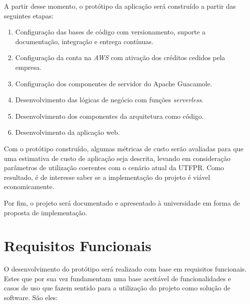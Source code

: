 A partir desse momento, o protótipo da aplicação será construído a partir das seguintes etapas:

\begin{enumerate}
    \item Configuração das bases de código com versionamento, suporte a documentação, integração e entrega contínuas.
    \item Configuração da conta na \textit{AWS} com ativação dos créditos cedidos pela empresa.
    \item Configuração dos componentes de servidor do Apache Guacamole.
    \item Desenvolvimento das lógicas de negócio com funções \textit{serverless}.
    \item Desenvolvimento dos componentes da arquitetura como código.
    \item Desenvolvimento da aplicação web.
\end{enumerate}

Com o protótipo construído, algumas métricas de custo serão avaliadas para que uma estimativa de custo de aplicação seja descrita, levando em consideração parâmetros de utilização coerentes com o cenário atual da UTFPR. Como resultado, é de interesse saber se a implementação do projeto é viável economicamente.

Por fim, o projeto será documentado e apresentado à universidade em forma de proposta de implementação.

\section{Requisitos Funcionais}\label{sec:requisitosFuncionais}

O desenvolvimento do protótipo será realizado com base em requisitos funcionais. Estes que por sua vez fundamentam uma base aceitável de funcionalidades e casos de uso que fazem sentido para a utilização do projeto como solução de software. São eles:


